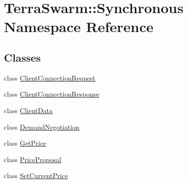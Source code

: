 \hypertarget{namespace_terra_swarm_1_1_synchronous}{\section{Terra\-Swarm\-:\-:Synchronous Namespace Reference}
\label{namespace_terra_swarm_1_1_synchronous}
}
\subsection*{Classes}
\begin{DoxyCompactItemize}
\item 
class \hyperlink{class_terra_swarm_1_1_synchronous_1_1_client_connection_request}{Client\-Connection\-Request}
\item 
class \hyperlink{class_terra_swarm_1_1_synchronous_1_1_client_connection_response}{Client\-Connection\-Response}
\item 
class \hyperlink{class_terra_swarm_1_1_synchronous_1_1_client_data}{Client\-Data}
\item 
class \hyperlink{class_terra_swarm_1_1_synchronous_1_1_demand_negotiation}{Demand\-Negotiation}
\item 
class \hyperlink{class_terra_swarm_1_1_synchronous_1_1_get_price}{Get\-Price}
\item 
class \hyperlink{class_terra_swarm_1_1_synchronous_1_1_price_proposal}{Price\-Proposal}
\item 
class \hyperlink{class_terra_swarm_1_1_synchronous_1_1_set_current_price}{Set\-Current\-Price}
\end{DoxyCompactItemize}
